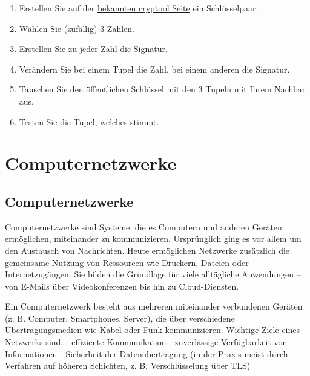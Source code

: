\documentclass[
  nswissgerman,
  a4paper,
  DIV=11,
  numbers=noendperiod,
  ngerman]{scrreprt}
\providecommand{\tightlist}{%
  \setlength{\itemsep}{0pt}\setlength{\parskip}{0pt}}
\begin{document}
\begin{tcolorbox}[enhanced jigsaw, arc=.35mm, bottomrule=.15mm, bottomtitle=1mm, breakable, colback=white, colbacktitle=quarto-callout-tip-color!10!white, colframe=quarto-callout-tip-color-frame, coltitle=black, left=2mm, leftrule=.75mm, opacityback=0, opacitybacktitle=0.6, rightrule=.15mm, title=\textcolor{quarto-callout-tip-color}{\faLightbulb}\hspace{0.5em}{Aufgabe}, titlerule=0mm, toprule=.15mm, toptitle=1mm]

\begin{enumerate}
\def\labelenumi{\arabic{enumi}.}
\tightlist
\item
  Erstellen Sie auf der
  \href{https://www.cryptool.org/de/cto/rsa-step-by-step/}{bekannten
  cryptool Seite} ein Schlüsselpaar.
\item
  Wählen Sie (zufällig) 3 Zahlen.
\item
  Erstellen Sie zu jeder Zahl die Signatur.
\item
  Verändern Sie bei einem Tupel die Zahl, bei einem anderen die
  Signatur.
\item
  Tauschen Sie den öffentlichen Schlüssel mit den 3 Tupeln mit Ihrem
  Nachbar aus.
\item
  Testen Sie die Tupel, welches stimmt.
\end{enumerate}

\end{tcolorbox}

\part{Computernetzwerke}

\chapter{Computernetzwerke}\label{computernetzwerke-1}

Computernetzwerke sind Systeme, die es Computern und anderen Geräten
ermöglichen, miteinander zu kommunizieren. Ursprünglich ging es vor
allem um den Austausch von Nachrichten. Heute ermöglichen Netzwerke
zusätzlich die gemeinsame Nutzung von Ressourcen wie Druckern, Dateien
oder Internetzugängen. Sie bilden die Grundlage für viele alltägliche
Anwendungen -- von E-Mails über Videokonferenzen bis hin zu
Cloud-Diensten.

Ein Computernetzwerk besteht aus mehreren miteinander verbundenen
Geräten (z. B. Computer, Smartphones, Server), die über verschiedene
Übertragungsmedien wie Kabel oder Funk kommunizieren. Wichtige Ziele
eines Netzwerks sind: - effiziente Kommunikation - zuverlässige
Verfügbarkeit von Informationen - Sicherheit der Datenübertragung (in
der Praxis meist durch Verfahren auf höheren Schichten, z. B.
Verschlüsselung über TLS)
\end{document}
